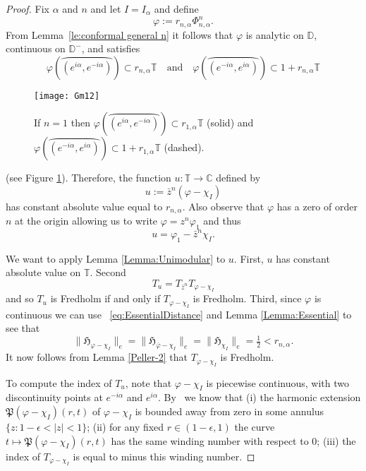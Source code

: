 \documentclass[11pt,reqno]{amsart}
\numberwithin{equation}{section}
\theoremstyle{plain}
\theoremstyle{definition}
\begin{document}
\begin{proof}
Fix $\alpha$ and $n$ and let $I = I_{\alpha}$ and define 
$${\varphi}:=r_{n,\alpha}\Phi_{n,\alpha}^n.$$
 From Lemma~\ref{le:conformal general n} it follows that ${\varphi}$ is analytic on ${ \mathbb{D}}$, continuous on ${ \mathbb{D}}^{-}$, and satisfies 
 $${\varphi}(\wideparen{(e^{i\alpha}, e^{-i\alpha})}) \subset r_{n,\alpha}{\mathbb{T}} \quad \mbox{and} \quad {\varphi}(\wideparen{(e^{-i\alpha}, e^{i\alpha})}) \subset 1+r_{n,\alpha}{\mathbb{T}}$$
\begin{figure}
		\begin{center}
			\texttt{[image: Gm12]}
		\end{center}
		\caption{\footnotesize If $n = 1$ then ${\varphi}(\wideparen{(e^{i\alpha},e^{-i\alpha})}) \subset r_{1,\alpha}{\mathbb{T}}$ (solid) and ${\varphi}(\wideparen{(e^{-i\alpha}, e^{i\alpha})}) \subset 1+r_{1,\alpha}{\mathbb{T}}$ (dashed). }
						\label{FigureGm12}
	\end{figure}
 
(see Figure \ref{FigureGm12}). 
   Therefore, the function $u: {\mathbb{T}} \to { \mathbb{C}}$ defined by
  $$u:=\bar z^n({\varphi} - \chi_{I})$$ has constant absolute value equal to $r_{n,\alpha}$. Also observe that ${\varphi}$ has a zero of order $n$ at the origin allowing us to write ${\varphi}=z^n{\varphi}_1$ and thus 
  $$u={\varphi}_1 - \bar z^n\chi_{I}.$$

We want to apply Lemma \ref{Lemma:Unimodular} to $u$.  First, $u$ has constant absolute value on ${\mathbb{T}}$. Second 
\begin{equation}\label{Toe-id}
T_u=T_{\bar z^n}T_{{\varphi}-\chi_I}
\end{equation} 
and so $T_u$ is Fredholm if and only if $T_{{\varphi}-\chi_I}$ is Fredholm. 
Third, since ${\varphi}$ is continuous we can use ~\eqref{eq:EssentialDistance} and Lemma \ref{Lemma:Essential} to see that  
$$\|{\mathfrak{H}}_{{\varphi}-\chi_I}\|_e= \|{\mathfrak{H}}_{\overline{\varphi} - \chi_{I}}\|_{e}  = \|{\mathfrak{H}}_{\chi_{I}}\|_e = \tfrac{1}{2} <r_{n,\alpha}.$$ It now follows from Lemma \ref{Peller-2} that $T_{{\varphi} - \chi_{I}}$ is Fredholm. 

To compute the index of $T_u$, note that ${\varphi} - \chi_{I}$ is piecewise continuous, with two discontinuity points at $e^{-i\alpha}$ and $e^{i\alpha}$. By~\cite[Theorems 1 and 2]{Sa} we know that (i)  the harmonic extension $\mathfrak{P}({\varphi} - \chi_{I})(r, t)$ of ${\varphi}-\chi_{I}$ is bounded away from zero in some annulus $\{z: 1-\epsilon<|z|<1\}$; (ii) for any fixed $r \in (1 - \epsilon, 1)$ the curve $t\mapsto \mathfrak{P}({\varphi} - \chi_{I})(r, t)$ has the same winding number with respect to $0$; (iii) the  index of $T_{{\varphi} - \chi_{I}}$ is equal to minus this winding number. 


\end{proof}
\end{document}
